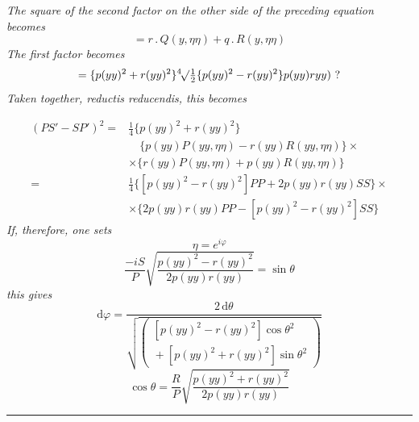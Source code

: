 \textit{The square of the second factor on the other side of the preceding equation becomes}
\[
=r\mathbin{.}Q(y,\eta\eta)+q\mathbin{.}R(y,\eta\eta)
\]
\textit{The first factor becomes}
\[
=\{p(yy)^2+r(yy)^2\}{}^4\!\surd \tfrac12
 \{p(yy)^2-r(yy)^2\}p(yy)ryy)\ ?
\]
\textit{Taken together, reductis reducendis, this becomes}



\[
\begin{aligned}
(PS'-SP')^2={}&\tfrac14\{p(yy)^2+r(yy)^2\}\\[6pt]&\quad\{p(yy)P(yy,\eta\eta)-r(yy)R(yy,\eta\eta)\}\times\\
&\times\{r(yy)P(yy,\eta\eta)+p(yy)R(yy,\eta\eta)\}\\[10pt]
={}&\tfrac14\{[p(yy)^2-r(yy)^2]PP+2p(yy)r(yy)SS\}\times\\
&\times\{2p(yy)r(yy)PP-[p(yy)^2-r(yy)^2]SS\}
\end{aligned}
\]
\textit{If, therefore, one sets}
\[
\eta=e^{i\varphi}
\]
\[
\dfrac{-iS}{P}\surd {\dfrac{p(yy)^2-r(yy)^2}{2p(yy)r(yy)}}=\sin\theta
\]
\textit{this gives}
\[
\mathrm d\varphi=
\dfrac{2\,\mathrm d\theta}
 {\surd {\left(\begin{gathered}{}[p(yy)^2-r(yy)^2]\cos\theta^2\\[3pt]{}+
[p(yy)^2+r(yy)^2]\sin\theta^2\end{gathered}\right)}}
\]
\[
\cos\theta=\dfrac RP\surd {\dfrac{p(yy)^2+r(yy)^2}{2p(yy)r(yy)}}
\]
\begin{center}\rule{0.23\textwidth}{0.3pt}\end{center}
\clearpage
\endgroup
